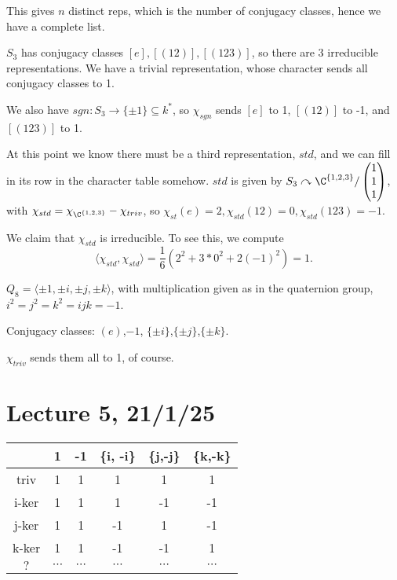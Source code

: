 \documentclass[x11names,reqno,14pt]{extarticle}
\begin{document}
This gives $n$ distinct reps, which is the number of conjugacy classes, hence we have a complete list. 

\exm

$S_3$ has conjugacy classes $[e], [(12)], [(123)]$, so there are 3 irreducible representations. We have a trivial representation, whose character sends all conjugacy classes to 1. 

We also have $sgn:S_3\to\{\pm1\}\subseteq k^*$, so $\chi_{sgn}$ sends $[e]$ to 1, $[(12)]$ to -1, and $[(123)]$ to 1. 

At this point we know there must be a third representation, $std$, and we can fill in its row in the character table somehow. $std$ is given by $S_3 \curvearrowright \C^{\{1,2,3\}}/\begin{pmatrix} 1 \\ 1 \\ 1 \end{pmatrix}$, with $\chi_{std} = \chi_{\C^{\{1,2,3\}}} - \chi_{triv}$, so $\chi_{st}(e) = 2, \chi_{std}(12) = 0, \chi_{std}(123) = -1$. 

We claim that $\chi_{std}$ is irreducible. To see this, we compute 
\[
\langle\chi_{std},\chi_{std}\rangle=\frac{1}{6}(2^2 + 3*0^2 + 2(-1)^2) = 1. 
\]

\exm

$Q_8 = \langle \pm1,\pm i,\pm j, \pm k\rangle$, with multiplication given as in the quaternion group, $i^2 = j^2 = k^2 = ijk = -1$. 

Conjugacy classes: $(e)$,$-1$, $\{\pm i\}$,$\{\pm j\}$,$\{\pm k\}$. 

$\chi_{triv}$ sends them all to 1, of course. 

\section*{Lecture 5, 21/1/25}

\begin{center}
\begin{tabular}{ c| c c c c c }
 & 1 & -1 & \{i, -i\} & \{j,-j\}&\{k,-k\} \\
\hline
triv & 1 & 1 & 1 & 1 & 1 \\
i-ker & 1 & 1 & 1 & -1 & -1 \\
j-ker & 1 & 1 & -1 & 1 & -1 \\
k-ker & 1 & 1 & -1 & -1 & 1 \\
$?$ & $\cdots$&$\cdots$ &$\cdots$ &$\cdots$ &$\cdots$  \\
\end{tabular}
\end{center}
\end{document}
